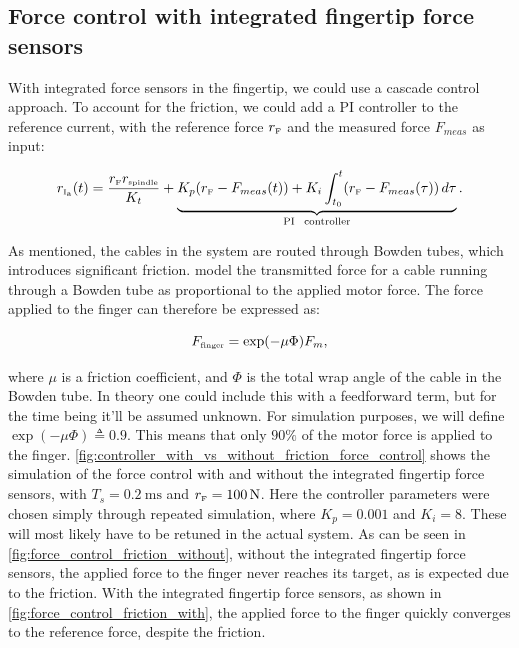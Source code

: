 \subsection{Force control with integrated fingertip force sensors}
\label{subsec:fingertip_sensors}

With integrated force sensors in the fingertip, we could use a cascade control approach. To account for the friction, we could add a PI controller to the reference current, with the reference force $r_{{\scriptscriptstyle\mathrm{F}}}$ and the measured force $F_{meas}$ as input:

\begin{equation}
    \label{eq:controller_design_torque_control_reference_with_force_feedback}
    r_{{\scriptscriptstyle\mathrm{I_a}}}(t) = \frac{r_{\scriptscriptstyle\mathrm{F}} r_{{\scriptscriptstyle\mathrm{spindle}}}}{K_t} + \underbrace{K_p (r_{{\scriptscriptstyle\mathrm{F}}} - F_{meas}(t)) + K_i \int_{t_0}^t (r_{{\scriptscriptstyle\mathrm{F}}} - F_{meas}(\tau)) \, d\tau}_{\text{PI \, controller}}.
\end{equation}

As mentioned, the cables in the system are routed through Bowden tubes, which introduces significant friction. \textcite{jeongFeedforwardFrictionCompensation2015} model the transmitted force for a cable running through a Bowden tube as proportional to the applied motor force. The force applied to the finger can therefore be expressed as:

\begin{equation}
    F_{{\scriptscriptstyle\mathrm{finger}}} = \exp(-\mu \Phi) F_m,
\end{equation}

where $\mu$ is a friction coefficient, and $\Phi$ is the total wrap angle of the cable in the Bowden tube. In theory one could include this with a feedforward term, but for the time being it'll be assumed unknown. For simulation purposes,  we will define $\exp(-\mu \Phi)\triangleq 0.9$. This means that only $90\%$ of the motor force is applied to the finger. \cref{fig:controller_with_vs_without_friction_force_control} shows the simulation of the force control with and without the integrated fingertip force sensors, with $T_s = \SI{0.2}{\milli\second}$ and $r_{{\scriptscriptstyle\mathrm{F}}}=\SI{100}{\newton}$. Here the controller parameters were chosen simply through repeated simulation, where $K_p = 0.001$ and $K_i = 8$. These will most likely have to be retuned in the actual system. As can be seen in \cref{fig:force_control_friction_without}, without the integrated fingertip force sensors, the applied force to the finger never reaches its target, as is expected due to the friction. With the integrated fingertip force sensors, as shown in \cref{fig:force_control_friction_with}, the applied force to the finger quickly converges to the reference force, despite the friction.

